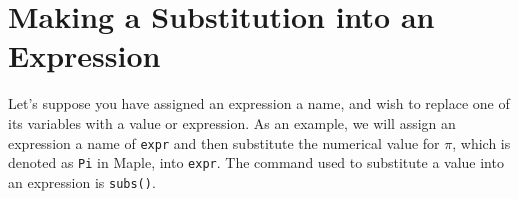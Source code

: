 \begin{maplegroup}
\begin{mapleinput}
\end{mapleinput}
\mapleresult
\begin{maplelatex}
\end{maplelatex}
\end{maplegroup}

\begin{maplegroup}
\begin{mapleinput}
\end{mapleinput}
\mapleresult
\begin{maplelatex}
\end{maplelatex}
\end{maplegroup}

\begin{maplegroup}
\begin{mapleinput}
\end{mapleinput}
\mapleresult
\begin{maplelatex}
\end{maplelatex}
\end{maplegroup}

\section{Making a Substitution into an Expression}

Let's suppose you have assigned an expression a name, and wish to replace one of its variables with a value or expression. As an example, we will assign an expression a name of \texttt{expr} and then substitute the numerical value for $\pi$, which is denoted as \texttt{Pi} in Maple, into \texttt{expr}. The command used to substitute a value into an expression is \texttt{subs()}.

